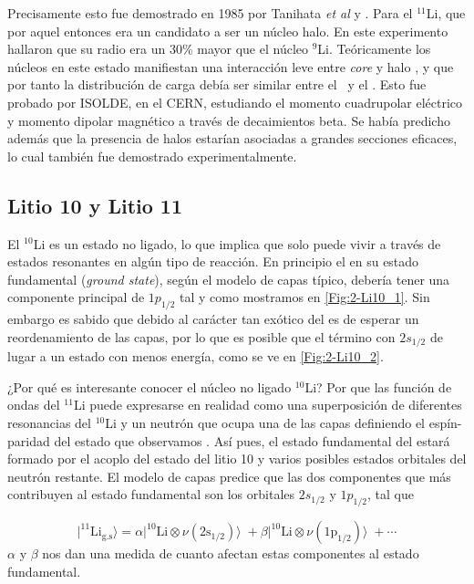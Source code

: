 Precisamente esto fue demostrado en 1985 por Tanihata \textit{et al} \cite{Tanihata1985PLB} y \cite{Tanihata1985PRL}. Para el $^{11}$Li, que por aquel entonces era un candidato a ser un núcleo halo. En este experimento hallaron que su radio era un 30\% mayor que el núcleo $^{9}$Li. Teóricamente los núcleos en este estado manifiestan una interacción leve entre \textit{core} y halo \cite{JONSON20041}, y que por tanto la distribución de carga debía ser similar entre el \litioNueve \ y el \litioOnce . Esto fue probado por ISOLDE, en el CERN, estudiando el momento cuadrupolar eléctrico \cite{ARNOLD199216} y momento dipolar magnético \cite{Arnold:180144} a través de decaimientos beta. Se había predicho además que la presencia de halos estarían asociadas a grandes secciones eficaces, lo cual también fue demostrado experimentalmente. 


\subsection{Litio 10 y Litio 11}

El $^{10}$Li es un estado no ligado, lo que implica que solo puede vivir a través de estados resonantes en algún tipo de reacción. En principio el \litioOnce en su estado fundamental (\textit{ground state}), según el modelo de capas típico, debería tener una componente principal de $1p_{1/2}$ tal y como mostramos en \cref{Fig:2-Li10_1}. Sin embargo es sabido que debido al carácter tan exótico del \litioDiez  es de esperar un reordenamiento de las capas, por lo que es posible que el término con $2s_{1/2}$ de lugar a un estado con menos energía, como se ve en \cref{Fig:2-Li10_2}.

¿Por qué es interesante conocer el núcleo no ligado $^{10}$Li? Por que las función de ondas del $^{11}$Li puede expresarse en realidad como una superposición de diferentes resonancias del $^{10}$Li y un neutrón que ocupa una de las capas definiendo el espín-paridad del estado que observamos \cite{SANETULLAEV2016481}. Así pues, el estado fundamental del \litioOnce estará formado por el acoplo del estado del litio 10 y varios posibles estados orbitales del neutrón restante. El modelo de capas predice que las dos componentes que más contribuyen al estado fundamental son los orbitales $2s_{1/2}$ y $1p_{1/2}$, tal que

\begin{equation}
    \vert^{11}\text{Li}_{\text{g.s}}\rangle = \alpha\vert ^{10}\text{Li} \otimes \nu(2\text{s}_{1/2})\rangle\; + \beta\vert ^{10}\text{Li} \otimes \nu(1\text{p}_{1/2})\rangle\; + \cdots \label{Ec:02-Litio11}
\end{equation}
$\alpha$ y $\beta$ nos dan una medida de cuanto afectan estas componentes al estado fundamental. 

